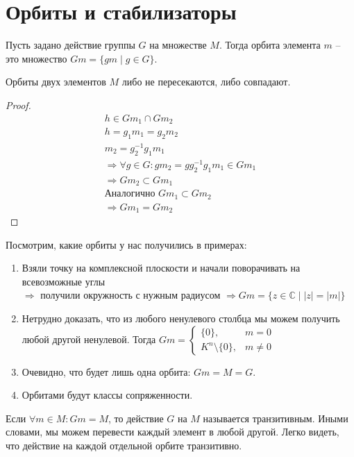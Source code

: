 \section{Орбиты и стабилизаторы}
\begin{conj}
    Пусть задано действие группы $G$ на множестве $M$.
    Тогда орбита элемента $m$ -- это множество $Gm = \{gm\; | \; g \in G\}$.
\end{conj}

\begin{theorem-non}
    Орбиты двух элементов $M$ либо не пересекаются, либо совпадают.
\end{theorem-non}
\begin{proof}
    \begin{gather*}
        h \in Gm_1 \cap Gm_2 \\
        h = g_1m_1 = g_2m_2 \\
        m_2 = g_2^{-1}g_1m_1  \\
        \Rightarrow \forall g \in G: gm_2 = gg_2^{-1}g_1m_1 \in Gm_1 \\
        \Rightarrow Gm_2 \subset Gm_1 \\
        \text{Аналогично } Gm_1 \subset Gm_2 \\
        \Rightarrow Gm_1 = Gm_2
    \end{gather*}
\end{proof}
Посмотрим, какие орбиты у нас получились в примерах:
\begin{enumerate}
    \item Взяли точку на комплексной плоскости и начали поворачивать на всевозможные углы \\ 
    $\Rightarrow$ получили окружность с нужным радиусом $\Rightarrow Gm = \{ z \in \mathbb{C} \; | \; |z| = |m| \}$
    \item Нетрудно доказать, что из любого ненулевого столбца мы можем получить любой другой ненулевой. 
    Тогда $Gm = \begin{cases}
        \{ 0 \}, & m = 0 \\
        K^n \setminus \{ 0 \}, & m \neq 0
    \end{cases} $
    \item Очевидно, что будет лишь одна орбита: $Gm = M = G$.
    \item Орбитами будут классы сопряженности.
\end{enumerate}

Если $\forall m \in M : Gm = M$, то действие $G$ на $M$ называется транзитивным. 
Иными словами, мы можем перевести каждый элемент в любой другой. 
Легко видеть, что действие на каждой отдельной орбите транзитивно.

